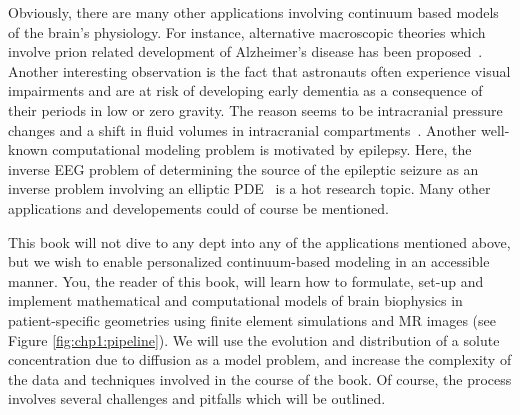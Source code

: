 Obviously, there are many other applications involving continuum based models of the brain's physiology. 
For instance, alternative macroscopic theories which involve prion related development of Alzheimer's 
disease has been proposed~\cite{fornari2019prion, kevrekidis2020anisotropic}. 
Another interesting observation is the fact that    
astronauts often experience
visual impairments and are at risk of developing early dementia as a
consequence of their periods in low or zero gravity. The reason seems
to be intracranial pressure changes and a shift in fluid volumes in
intracranial compartments~\cite{alperin2018spaceflight}. 
Another well-known computational modeling problem is  motivated by epilepsy.  Here, 
the inverse EEG problem of determining the source of the epileptic seizure 
as an inverse problem involving an elliptic PDE~\cite{grech2008review} is a hot research topic. 
Many other applications and developements could of course be mentioned. 


This book will not dive to any dept into any of the applications mentioned above,  but we
wish to enable personalized continuum-based modeling in an accessible
manner. You, the reader of this book, will learn how to formulate,
set-up and implement mathematical and computational models of brain
biophysics in patient-specific geometries using finite element
simulations and MR images (see Figure \ref{fig:chp1:pipeline}). We
will use the evolution and distribution of a solute concentration due
to diffusion as a model problem, and increase the complexity of the
data and techniques involved in the course of the book. Of course,
the process involves several challenges and pitfalls which will be
outlined.

